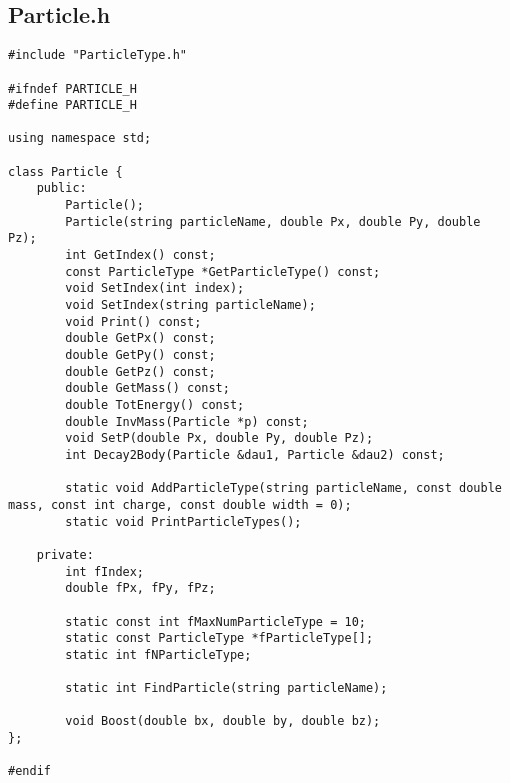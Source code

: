 \documentclass{article}
\begin{document}
\subsection*{Particle.h}
\begin{verbatim}
#include "ParticleType.h"

#ifndef PARTICLE_H
#define PARTICLE_H

using namespace std;

class Particle {
    public:
        Particle();
        Particle(string particleName, double Px, double Py, double Pz);
        int GetIndex() const;
        const ParticleType *GetParticleType() const;
        void SetIndex(int index);
        void SetIndex(string particleName);
        void Print() const;
        double GetPx() const;
        double GetPy() const;
        double GetPz() const;
        double GetMass() const;
        double TotEnergy() const;
        double InvMass(Particle *p) const;
        void SetP(double Px, double Py, double Pz);
        int Decay2Body(Particle &dau1, Particle &dau2) const;

        static void AddParticleType(string particleName, const double mass, const int charge, const double width = 0);
        static void PrintParticleTypes();

    private:
        int fIndex;
        double fPx, fPy, fPz;

        static const int fMaxNumParticleType = 10;
        static const ParticleType *fParticleType[];
        static int fNParticleType;

        static int FindParticle(string particleName);

        void Boost(double bx, double by, double bz);
};

#endif
\end{verbatim}
\end{document}
